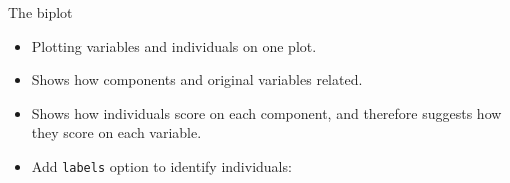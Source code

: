 \documentclass[ignorenonframetext,]{beamer}
\newenvironment{Shaded}{\begin{snugshade}}{\end{snugshade}}
\newcommand{\DataTypeTok}[1]{\textcolor[rgb]{0.13,0.29,0.53}{#1}}
\newcommand{\KeywordTok}[1]{\textcolor[rgb]{0.13,0.29,0.53}{\textbf{#1}}}
\newcommand{\NormalTok}[1]{#1}
\newcommand{\OperatorTok}[1]{\textcolor[rgb]{0.81,0.36,0.00}{\textbf{#1}}}
\newcommand{\StringTok}[1]{\textcolor[rgb]{0.31,0.60,0.02}{#1}}
\begin{document}
\begin{frame}[fragile]{The biplot}
\protect\hypertarget{the-biplot}{}

\begin{itemize}
\item
  Plotting variables and individuals on one plot.
\item
  Shows how components and original variables related.
\item
  Shows how individuals score on each component, and therefore suggests
  how they score on each variable.
\item
  Add \texttt{labels} option to identify individuals:
\end{itemize}

\begin{Shaded}
\end{Shaded}

\end{frame}
\end{document}
